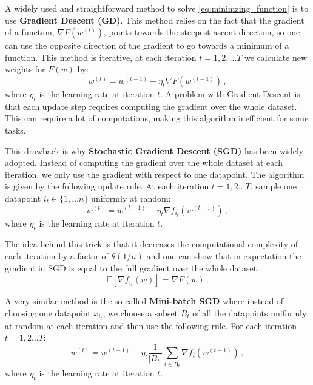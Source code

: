 \documentclass[a4paper,11pt,oneside]{report}
\begin{document}
A widely used and straightforward method to solve \autoref{eq:minimzing_function} is to use \textbf{Gradient Descent (GD)}. This method relies on the fact that the gradient of a function, $\nabla F(w^{(t)})$, points towards the steepest ascent direction, so one can use the opposite direction of the gradient to go towards a minimum of a function. This method is iterative, at each iteration $t=1,2, \dots T$ we calculate new weights for $F(w)$ by:
\begin{equation}\label{eq:GD}
    w^{(t)} = w^{(t-1)} - \eta_t \nabla F(w^{(t-1)}) \,,
\end{equation}
where $\eta_t$ is the learning rate at iteration $t$.
A problem with Gradient Descent is that each update step requires computing the gradient over the whole dataset. This can require a lot of computations, making this algorithm inefficient for some tasks. 

This drawback is why \textbf{Stochastic Gradient Descent (SGD)} has been widely adopted. Instead of computing the gradient over the whole dataset at each iteration, we only use the gradient with respect to one datapoint. The algorithm is given by the following update rule. At each iteration $t=1,2 \dots T$, sample one datapoint $i_t \in \{1,\dots n\}$ uniformly at random:
\begin{equation}\label{eq:SGD}
    w^{(t)} = w^{(t-1)} -\eta_t \nabla f_{i_t}(w^{(t-1)})\,,
\end{equation}
where $\eta_t$ is the learning rate at iteration $t$.

The idea behind this trick is that it decreases the computational complexity of each iteration by a factor of $\theta(1/n)$ and one can show that in expectation the gradient in SGD is equal to the full gradient over the whole dataset:
\begin{equation}\label{eq:unbaisedSGD}
    \mathbb{E}[\nabla f_{i_t}(w)] = \nabla F(w)\,.
\end{equation}

A very similar method is the so called \textbf{Mini-batch SGD} where instead of choosing one datapoint $x_{i_t}$, we choose a subset $B_t$ of all the datapoints uniformly at random at each iteration and then use the following  rule. For each iteration $t = 1,2 \dots T$:
\begin{equation}\label{eq:minibatchSGD}
    w^{(t)} = w^{(t-1)} -\eta_t \frac{1}{\mathopen|B_t\mathclose|}\sum_{i \in B_t}\nabla f_{i}(w^{(t-1)})\,,
\end{equation}
where $\eta_t$ is the learning rate at iteration $t$.
\end{document}
